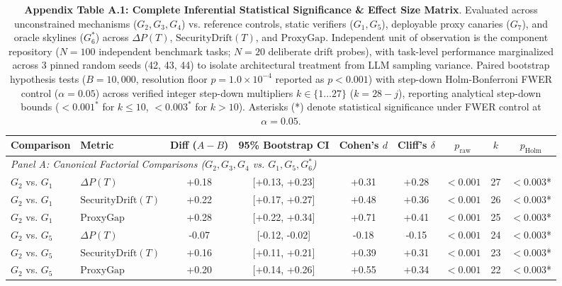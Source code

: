 \begin{table}[t]
\centering
\small
\caption{\textbf{Appendix Table A.1: Complete Inferential Statistical Significance \& Effect Size Matrix}. Evaluated across unconstrained mechanisms ($G_2, G_3, G_4$) vs. reference controls, static verifiers ($G_1, G_5$), deployable proxy canaries ($G_7$), and oracle skylines ($G_6^*$) across $\Delta P(T)$, $\text{SecurityDrift}(T)$, and $\text{ProxyGap}$. Independent unit of observation is the component repository ($N = 100$ independent benchmark tasks; $N = 20$ deliberate drift probes), with task-level performance marginalized across 3 pinned random seeds (42, 43, 44) to isolate architectural treatment from LLM sampling variance. Paired bootstrap hypothesis tests ($B = 10{,}000$, resolution floor $p = 1.0 \times 10^{-4}$ reported as $p < 0.001$) with step-down Holm-Bonferroni FWER control ($\alpha = 0.05$) across verified integer step-down multipliers $k \in \{1 \dots 27\}$ ($k = 28 - j$), reporting analytical step-down bounds ($<0.001^*$ for $k \le 10$, $<0.003^*$ for $k > 10$). Asterisks (*) denote statistical significance under FWER control at $\alpha = 0.05$.}
\label{tab:significance_testing_full}
\begin{tabular}{llccccccc}
\toprule
\textbf{Comparison} & \textbf{Metric} & \textbf{Diff ($A - B$)} & \textbf{95\% Bootstrap CI} & \textbf{Cohen's $d$} & \textbf{Cliff's $\delta$} & \textbf{$p_{\text{raw}}$} & \textbf{$k$} & \textbf{$p_{\text{Holm}}$} \\
\midrule
\multicolumn{9}{l}{\textit{Panel A: Canonical Factorial Comparisons ($G_2, G_3, G_4$ vs. $G_1, G_5, G_6^*$)}} \\
\midrule
$G_2$ vs. $G_1$ & $\Delta P(T)$ & +0.18 & [+0.13, +0.23] & +0.31 & +0.28 & $<0.001$ & 27 & \textbf{$<0.003$}* \\
$G_2$ vs. $G_1$ & $\text{SecurityDrift}(T)$ & +0.22 & [+0.17, +0.27] & +0.48 & +0.36 & $<0.001$ & 26 & \textbf{$<0.003$}* \\
$G_2$ vs. $G_1$ & $\text{ProxyGap}$ & +0.28 & [+0.22, +0.34] & +0.71 & +0.41 & $<0.001$ & 25 & \textbf{$<0.003$}* \\
$G_2$ vs. $G_5$ & $\Delta P(T)$ & -0.07 & [-0.12, -0.02] & -0.18 & -0.15 & $<0.001$ & 24 & \textbf{$<0.003$}* \\
$G_2$ vs. $G_5$ & $\text{SecurityDrift}(T)$ & +0.16 & [+0.11, +0.21] & +0.39 & +0.31 & $<0.001$ & 23 & \textbf{$<0.003$}* \\
$G_2$ vs. $G_5$ & $\text{ProxyGap}$ & +0.20 & [+0.14, +0.26] & +0.55 & +0.34 & $<0.001$ & 22 & \textbf{$<0.003$}* \\

\end{tabular}
\end{table}
